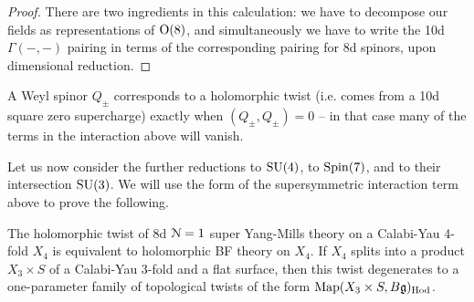 \documentclass[10pt, oneside]{article}
\begin{document}
\begin{proof}
There are two ingredients in this calculation: we have to decompose our fields as representations of $\mathrm{O}(8)$, and simultaneously we have to write the 10d $\Gamma(-,-)$ pairing in terms of the corresponding pairing for 8d spinors, upon dimensional reduction. 
\end{proof}

\begin{remark}
A Weyl spinor $Q_\pm$ corresponds to a holomorphic twist (i.e. comes from a 10d square zero supercharge) exactly when $(Q_\pm,Q_\pm)=0$ -- in that case many of the terms in the interaction above will vanish.
\end{remark}

Let us now consider the further reductions to $\mathrm{SU}(4)$, to $\mathrm{Spin}(7)$, and to their intersection $\mathrm{SU}(3)$.  We will use the form of the supersymmetric interaction term above to prove the following.

\begin{theorem} \label{8d_holo_twist_thm}
The holomorphic twist of 8d $\mathcal{N}=1$ super Yang-Mills theory on a Calabi-Yau 4-fold $X_4$ is equivalent to holomorphic BF theory on $X_4$. If $X_4$ splits into a product $X_3 \times S$ of a Calabi-Yau 3-fold and a flat surface, then this twist degenerates to a one-parameter family of topological twists of the form $\operatorname{Map}(X_3 \times S, B\mathfrak{g})_{\mathrm{Hod}}$.
\end{theorem}
\end{document}
